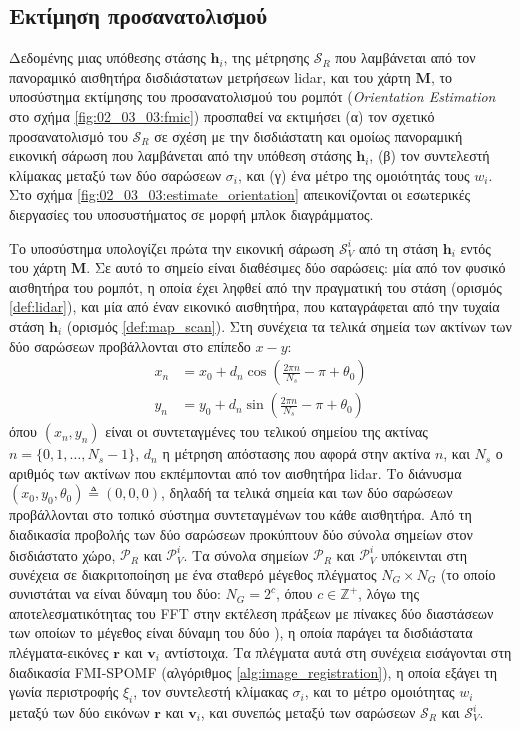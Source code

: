 \subsection{Εκτίμηση προσανατολισμού}
\label{subsection:02_03_03:02}

Δεδομένης μιας υπόθεσης στάσης $\bm{h}_i$, της μέτρησης $\mathcal{S}_R$ που
λαμβάνεται από τον πανοραμικό αισθητήρα δισδιάστατων μετρήσεων lidar, και του
χάρτη $\bm{M}$, το υποσύστημα εκτίμησης του προσανατολισμού του ρομπότ
(\textit{Orientation Estimation} στο σχήμα \ref{fig:02_03_03:fmic}) προσπαθεί να
εκτιμήσει (α) τον σχετικό προσανατολισμό του $\mathcal{S}_R$ σε σχέση με την
δισδιάστατη και ομοίως πανοραμική εικονική σάρωση που λαμβάνεται από την
υπόθεση στάσης $\bm{h}_i$, (β) τον συντελεστή κλίμακας μεταξύ των δύο σαρώσεων
$\sigma_i$, και (γ) ένα μέτρο της ομοιότητάς τους $w_i$.  Στο σχήμα
\ref{fig:02_03_03:estimate_orientation} απεικονίζονται οι εσωτερικές διεργασίες
του υποσυστήματος σε μορφή μπλοκ διαγράμματος.

Το υποσύστημα υπολογίζει πρώτα την εικονική σάρωση $\mathcal{S}_V^i$ από τη
στάση $\bm{h}_i$ εντός του χάρτη $\bm{M}$. Σε αυτό το σημείο είναι διαθέσιμες
δύο σαρώσεις: μία από τον φυσικό αισθητήρα του ρομπότ, η οποία έχει ληφθεί από
την πραγματική του στάση (ορισμός \ref{def:lidar}), και μία από έναν εικονικό
αισθητήρα, που καταγράφεται από την τυχαία στάση $\bm{h}_i$ (ορισμός
\ref{def:map_scan}). Στη συνέχεια τα τελικά σημεία των ακτίνων των δύο σαρώσεων
προβάλλονται στο επίπεδο $x-y$:
\begin{align}
  x_n &= x_0 + d_n \cos(\frac{2 \pi n}{N_s} - \pi + \theta_0) \label{eq:point_projection_x} \\
  y_n &= y_0 + d_n \sin(\frac{2 \pi n}{N_s} - \pi + \theta_0) \label{eq:point_projection_y}
\end{align}
όπου $(x_n,y_n)$ είναι οι συντεταγμένες του τελικού σημείου της ακτίνας $n
= \{0,1,\dots, N_s-1\}$, $d_n$ η μέτρηση απόστασης που αφορά στην ακτίνα $n$,
και $N_s$ ο αριθμός των ακτίνων που εκπέμπονται από τον αισθητήρα lidar.  Το
διάνυσμα $(x_0,y_0,\theta_0) \triangleq (0,0,0)$, δηλαδή τα τελικά σημεία και
των δύο σαρώσεων προβάλλονται στο τοπικό σύστημα συντεταγμένων του κάθε
αισθητήρα.  Από τη διαδικασία προβολής των δύο σαρώσεων προκύπτουν δύο σύνολα
σημείων στον δισδιάστατο χώρο, $\mathcal{P}_R$ και $\mathcal{P}_V^i$.  Τα
σύνολα σημείων $\mathcal{P}_R$ και $\mathcal{P}_V^i$ υπόκεινται στη συνέχεια σε
διακριτοποίηση με ένα σταθερό μέγεθος πλέγματος $N_G \times N_G$ (το οποίο
συνιστάται να είναι δύναμη του δύο: $N_G = 2^c$, όπου $c \in \mathbb{Z}^{+}$,
λόγω της αποτελεσματικότητας του FFT στην εκτέλεση πράξεων με πίνακες δύο
διαστάσεων των οποίων το μέγεθος είναι δύναμη του δύο \cite{Bulow2010}), η
οποία παράγει τα δισδιάστατα πλέγματα-εικόνες $\bm{r}$ και $\bm{v}_i$
αντίστοιχα. Τα πλέγματα αυτά στη συνέχεια εισάγονται στη διαδικασία FMI-SPOMF
(αλγόριθμος \ref{alg:image_registration}), η οποία εξάγει τη γωνία περιστροφής
$\xi_i$, τον συντελεστή κλίμακας $\sigma_i$, και το μέτρο ομοιότητας $w_i$
μεταξύ των δύο εικόνων $\bm{r}$ και $\bm{v}_i$, και συνεπώς μεταξύ των σαρώσεων
$\mathcal{S}_R$ και $\mathcal{S}_V^i$.


